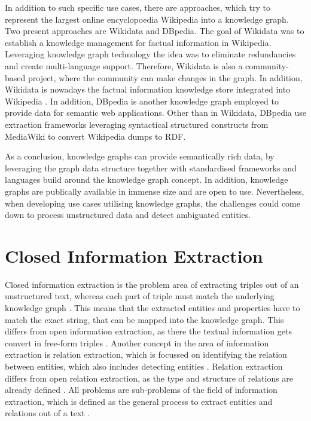 \documentclass[a4paper,oneside,bibliography=totoc]{scrbook}
\begin{document}
In addition to such specific use cases, there are approaches, which try to represent the largest online encyclopoedia Wikipedia into a knowledge graph. Two present approaches are Wikidata and DBpedia. The goal of Wikidata was to establish a knowledge management for factual information in Wikipedia. Leveraging knowledge graph technology the idea was to eliminate redundancies and create multi-language support. Therefore, Wikidata is also a community-based project, where the community can make changes in the graph. In addition, Wikidata is nowadays the factual information knowledge store integrated into Wikipedia \cite{Vrandecic2014}. In addition, DBpedia is another knowledge graph employed to provide data for semantic web applications. Other than in Wikidata, DBpedia use extraction frameworks leveraging syntactical structured constructs from MediaWiki to convert Wikipedia dumps to \ac{RDF}.

As a conclusion, knowledge graphs can provide semantically rich data, by leveraging the graph data structure together with standardised frameworks and languages build around the knowledge graph concept. In addition, knowledge graphs are publically available in immense size and are open to use. Nevertheless, when developing use cases utilising knowledge graphs, the challenges could come down to process unstructured data and detect ambiguated entities.

\section{Closed Information Extraction}
\label{sec:closed_information_extraction}
Closed information extraction is the problem area of extracting triples out of an unstructured text, whereas each part of triple must match the underlying knowledge graph \cite{Josifoski2021}. This means that the extracted entities and properties have to match the exact string, that can be mapped into the knowledge graph. This differs from open information extraction, as there the textual information gets convert in free-form triples \cite{Etzioni2008}.
Another concept in the area of information extraction is relation extraction, which is focussed on identifying the relation between entities, which also includes detecting entities \cite{Zhao2024}. Relation extraction differs from open relation extraction, as the type and structure of relations are already defined \cite{Kamp2023}. All problems are sub-problems of the field of information extraction, which is defined as the general process to extract entities and relations out of a text \cite{Etzioni2008}.
\end{document}
